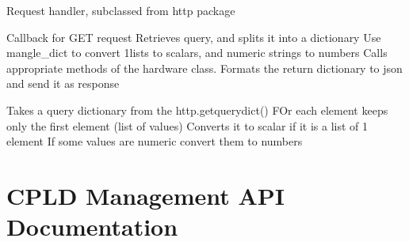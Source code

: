 \documentclass[letterpaper,10pt,english]{sphinxmanual}
\begin{document}
\begin{fulllineitems}
\label{\detokenize{webserverdocs:web_server.MyServer}}
\pysigstartsignatures
{}
\pysigstopsignatures
\sphinxAtStartPar
Request handler, subclassed from http package

\begin{fulllineitems}
\label{\detokenize{webserverdocs:web_server.MyServer.do_GET}}
\pysigstartsignatures
{}
\pysigstopsignatures
\sphinxAtStartPar
Callback for GET request
Retrieves query, and splits it into a dictionary
Use mangle\_dict to convert 1\sphinxhyphen{}lists to scalars,
and numeric strings to numbers
Calls appropriate methods of the hardware class.
Formats the return dictionary to json and send it as response

\end{fulllineitems}


\end{fulllineitems}


\begin{fulllineitems}
\label{\detokenize{webserverdocs:web_server.mangle_dict}}
\pysigstartsignatures
{}
\pysigstopsignatures
\sphinxAtStartPar
Takes a query dictionary from the http.getquerydict()
FOr each element keeps only the first element (list of values)
Converts it to scalar if it is a list of 1 element
If some values are numeric convert them to numbers

\end{fulllineitems}


\sphinxstepscope


\chapter{CPLD Management API Documentation}
\label{\detokenize{cplddocs:module-config_ip}}\label{\detokenize{cplddocs:cpld-management-api-documentation}}\label{\detokenize{cplddocs::doc}}
\end{document}

